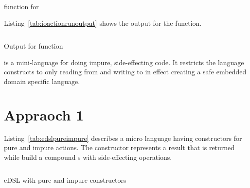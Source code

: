 \documentclass[thesis-solanki.tex]{subfiles}
\begin{document}
\begin{code-list}[H]
\begin{singlespace}
\inputminted{haskell}{haskell-proto4-ioaction-run.hs}
\end{singlespace}
\caption{ function for }
\label{tab:ioactionrun}
\end{code-list}

Listing~\ref{tab:ioactionrunoutput} shows the output for the  function.

\begin{code-list}[H]
\begin{singlespace}
\inputminted{haskell}{haskell-proto4-ioaction-run-output.hs}
\end{singlespace}
\caption{Output for  function}
\label{tab:ioactionrunoutput}
\end{code-list}

 is a mini-language for doing impure, side-effecting code. It restricts the language constructs to only reading 
from  and writing to  in effect creating a safe embedded domain specific language.  

\begin{comment}
\begin{code-list}[H]
\begin{singlespace}
  \inputminted[linenos]{haskell}{haskell-proto4-purvey-wincer.hs}
\end{singlespace}
\caption{\protect\haskellConstruct{IOAction} definitions}
\label{lis:IOAction}
\end{code-list}
\end{comment}




\section{Appraoch 1}

Listing~\ref{tab:edslpureimpure} describes a micro language having constructors for pure and impure actions. The 
constructor represents a result that is returned while  build a compound s
with side-effecting operations.

\begin{code-list}[H]
\begin{singlespace}
  \inputminted[linenos, firstline=12, lastline=21]{haskell}{haskell-proto4-myrtle-uppers.hs}
\end{singlespace}
\caption{eDSL with pure and impure constructors}
\label{tab:edslpureimpure}
\end{code-list}
\end{document}
